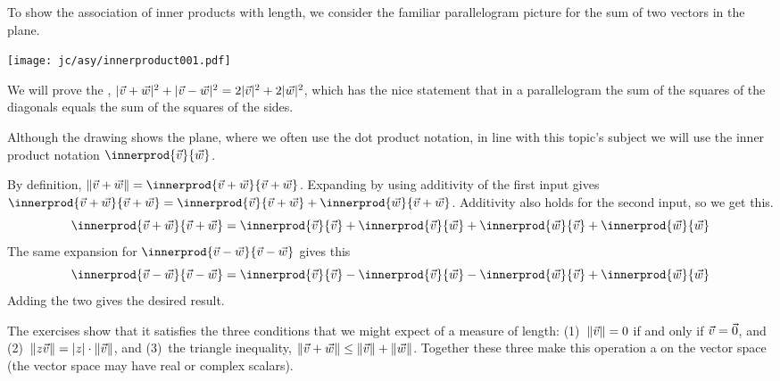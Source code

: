 To show the association of inner products with length, we consider  
the familiar parallelogram picture for the sum of two vectors in the plane.
\begin{center}
  \texttt{[image: jc/asy/innerproduct001.pdf]}
\end{center}
We will prove the 
,
$\lvert\vec{v}+\vec{w}\rvert^2+\lvert\vec{v}-\vec{w}\rvert^2=2\lvert\vec{v}\rvert^2+2\lvert\vec{w}\rvert^2$,
which has the nice statement that in a parallelogram the sum of the squares 
of the diagonals equals the sum of the squares of the sides.

Although the drawing shows the plane, where we often use the dot product 
notation, in line with this topic's subject we will use the inner product
notation $\innerprod{\vec{v}}{\vec{w}}$.

By definition,
$
  \norm{\vec{v}+\vec{w}}=\innerprod{\vec{v}+\vec{w}}{\vec{v}+\vec{w}}
$.
Expanding by using additivity of the first input gives 
$\innerprod{\vec{v}+\vec{w}}{\vec{v}+\vec{w}}
=\innerprod{\vec{v}}{\vec{v}+\vec{w}}+\innerprod{\vec{w}}{\vec{v}+\vec{w}}$.
Additivity also holds for the second input, so we get this.
\begin{equation*}
  \innerprod{\vec{v}+\vec{w}}{\vec{v}+\vec{w}}
  =\innerprod{\vec{v}}{\vec{v}}
   +\innerprod{\vec{v}}{\vec{w}}
   +\innerprod{\vec{w}}{\vec{v}}
   +\innerprod{\vec{w}}{\vec{w}}
\end{equation*}
The same expansion for $\innerprod{\vec{v}-\vec{w}}{\vec{v}-\vec{w}}$
gives this
\begin{equation*}
  \innerprod{\vec{v}-\vec{w}}{\vec{v}-\vec{w}}
  =\innerprod{\vec{v}}{\vec{v}}
   -\innerprod{\vec{v}}{\vec{w}}
   -\innerprod{\vec{w}}{\vec{v}}
   +\innerprod{\vec{w}}{\vec{w}}
\end{equation*}
Adding the two gives the desired result. 

The exercises show that it satisfies the three conditions that 
we might expect of a measure of length: 
(1)~$\lVert\vec{v}\rVert=0$ if and only if
$\vec{v}=\vec{0}$,
and (2)~$\lVert z\vec{v}\rVert=\lvert z\rvert\cdot\lVert\vec{v}\rVert$, and
(3)~the triangle inequality, 
$\lVert\vec{v}+\vec{w}\rVert\leq\lVert\vec{v}\rVert+\lVert\vec{w}\rVert$.
Together these three make this operation a  on the
vector space (the vector space may have real or complex scalars).

